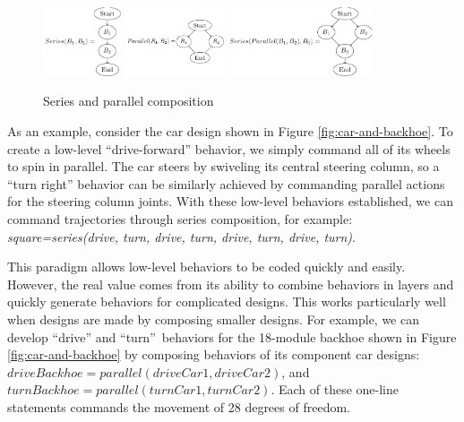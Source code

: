 \documentclass[graybox]{svmult}
\begin{document}
\begin{figure}
\begin{center}
\includegraphics[height=0.8in]{images/tikz/series.pdf}
\includegraphics[height=0.8in]{images/tikz/parallel.pdf} \vspace{0.in}
\includegraphics[height=0.8in]{images/tikz/parallel-and-series.pdf}
\end{center}
\caption{Series and parallel composition }
\label{fig:graph-composition}
\end{figure}

As an example, consider the car design shown in Figure \ref{fig:car-and-backhoe}. To create a low-level
``drive-forward'' behavior, we simply command all of its wheels to spin  in parallel.
The car steers by swiveling its central steering column, so a ``turn right''
behavior can be similarly achieved by commanding parallel actions for the steering column joints.
With these low-level behaviors established, we can command trajectories through series
composition, for example: \textit{square=series(drive, turn, drive, turn, drive, turn,
drive, turn)}.

This paradigm  allows  low-level behaviors to be coded quickly and
easily. However, the real value comes from its ability to  combine behaviors
in layers and quickly generate behaviors for complicated designs. This works
particularly well when designs are made by composing smaller designs. For
example, we can develop ``drive'' and ``turn''\ behaviors for the
18-module backhoe shown in Figure \ref{fig:car-and-backhoe} by composing  behaviors of
its component car designs: \(driveBackhoe= parallel( driveCar1, driveCar2)\),
and \(turnBackhoe = parallel(turnCar1, turnCar2)\). Each of these one-line
statements commands the movement of  28 degrees of freedom.
\end{document}

